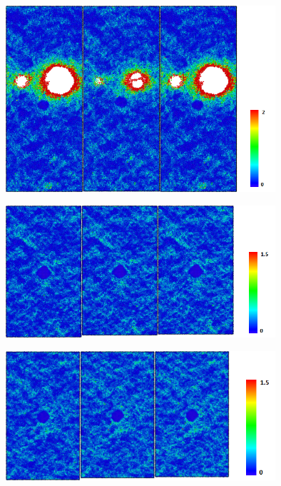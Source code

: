 \begin{figure}[htp]
\centering
\includegraphics[width=10cm]{../ResumenImagenes/Figures/NanoParticles/Snapshots/cuSphereTension_400K_Snapshots.png}
\caption[Inclusión de Cu-FCC bajo tracción a 400K]{}
\label{C4:fg:snapshot_ten_FCC_400K}
\end{figure}

\begin{figure}[htp]
\centering
\includegraphics[width=10cm]{../ResumenImagenes/Figures/NanoParticles/Snapshots/cuSphereCompression_10K_Snapshots.png}
\caption[Inclusión de Cu-FCC bajo compresión a 10K]{}
\label{C4:fg:snapshot_comp_FCC_10K}
\end{figure}

\begin{figure}[htp]
\centering
\includegraphics[width=10cm]{../ResumenImagenes/Figures/NanoParticles/Snapshots/cuSphereCompression_200K_Snapshots.png}
\caption[Inclusión de Cu-FCC bajo compresión a 200K]{}
\label{C4:fg:snapshot_comp_FCC_200K}
\end{figure}

